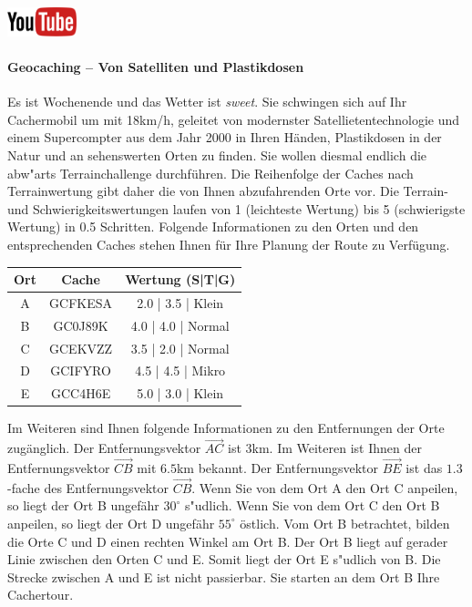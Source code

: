 \documentclass[a4paper, 9pt]{scrartcl}\usepackage[]{graphicx}\usepackage[]{xcolor}
\begin{document}
\hfill\href{https://youtu.be/3LAq3R0rS14}{\includegraphics[width =
  2cm]{img/youtube}} %
\hspace{2Ex}

\paragraph{Geocaching -- Von Satelliten und Plastikdosen}



Es ist Wochenende und das Wetter ist \textit{sweet}. Sie schwingen sich auf
Ihr Cachermobil um mit 18km/h, geleitet von modernster
Satellietentechnologie und einem Supercompter aus dem Jahr 2000 in Ihren
H{\"a}nden, Plastikdosen in der Natur und an sehenswerten Orten zu finden. Sie
wollen diesmal endlich die abw{"a}rts Terrainchallenge
durchf{\"u}hren. Die Reihenfolge der Caches nach Terrainwertung gibt daher
die von Ihnen abzufahrenden Orte vor. Die Terrain- und
Schwierigkeitswertungen laufen von 1 (leichteste Wertung) bis 5
(schwierigste Wertung) in 0.5 Schritten. Folgende Informationen zu den
Orten und den entsprechenden Caches stehen Ihnen f{\"u}r Ihre Planung der Route
zu Verf{\"u}gung.

\begin{center}
  \begin{tabular}{ ccc }
    \toprule
    Ort & Cache & Wertung (S|T|G) \\
    \midrule
    A & GCFKESA & 2.0 | 3.5 | Klein \\
    B & GC0J89K & 4.0 | 4.0 | Normal \\ 
    C & GCEKVZZ & 3.5 | 2.0 | Normal \\ 
    D & GCIFYRO & 4.5 | 4.5 | Mikro \\ 
    E & GCC4H6E & 5.0 | 3.0 | Klein \\     
 \bottomrule
\end{tabular}
\end{center}

Im Weiteren sind Ihnen folgende Informationen zu den Entfernungen der Orte
zug{\"a}nglich. Der Entfernungsvektor $\overrightarrow{AC}$ ist
$3$km. Im Weiteren ist Ihnen der Entfernungsvektor
$\overrightarrow{CB}$ mit $6.5$km bekannt. Der
Entfernungsvektor $\overrightarrow{BE}$ ist das $1.3$-fache
des Entfernungsvektor $\overrightarrow{CB}$. Wenn Sie von dem Ort A den Ort
C anpeilen, so liegt der Ort B ungef{\"a}hr $30^\circ$
s{"u}dlich. Wenn Sie von dem Ort C den Ort B anpeilen, so liegt
der Ort D ungef{\"a}hr $55^\circ$ {\"o}stlich. Vom Ort B
betrachtet, bilden die Orte C und D einen rechten Winkel am Ort B. Der Ort
B liegt auf gerader Linie zwischen den Orten C und E. Somit liegt der Ort E
s{"u}dlich von B. Die Strecke zwischen A und E ist nicht
passierbar. Sie starten an dem Ort B Ihre Cachertour. \\
\end{document}
